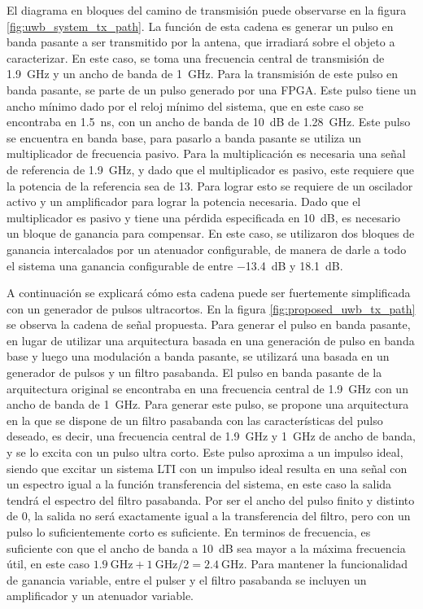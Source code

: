 El diagrama en bloques del camino de transmisión puede observarse en la figura
\ref{fig:uwb_system_tx_path}. La función de esta cadena es generar un pulso en
banda pasante a ser transmitido por la antena, que irradiará sobre el objeto a
caracterizar. En este caso, se toma una frecuencia central de transmisión de
\qty{1.9}{\giga\hertz} y un ancho de banda de \qty{1}{\giga\hertz}. Para la
transmisión de este pulso en banda pasante, se parte de un pulso generado por
una FPGA. Este pulso tiene un ancho mínimo dado por el reloj mínimo del sistema,
que en este caso se encontraba en \qty{1.5}{\nano\second}, con un ancho de banda
de \qty{10}{\dB} de \qty{1.28}{\giga\hertz}. Este pulso se encuentra en banda
base, para pasarlo a banda pasante se utiliza un multiplicador de frecuencia
pasivo. Para la multiplicación es necesaria una señal de referencia de
\qty{1.9}{\giga\hertz}, y dado que el multiplicador es pasivo, este requiere que
la potencia de la referencia sea de \qty{13}{\dBm}.  Para lograr esto se
requiere de un oscilador activo y un amplificador para lograr la potencia
necesaria. Dado que el multiplicador es pasivo y tiene una pérdida especificada
en \qty{10}{\dB}, es necesario un bloque de ganancia para compensar. En este
caso, se utilizaron dos bloques de ganancia intercalados por un atenuador
configurable, de manera de darle a todo el sistema una ganancia configurable de
entre \qty{-13.4}{\dB} y \qty{18.1}{\dB}.

A continuación se explicará cómo esta cadena puede ser fuertemente simplificada
con un generador de pulsos ultracortos. En la figura
\ref{fig:proposed_uwb_tx_path} se observa la cadena de señal propuesta. Para
generar el pulso en banda pasante, en lugar de utilizar una arquitectura basada
en una generación de pulso en banda base y luego una modulación a banda pasante,
se utilizará una basada en un generador de pulsos y un filtro pasabanda. El
pulso en banda pasante de la arquitectura original se encontraba en una
frecuencia central de \qty{1.9}{\giga\hertz} con un ancho de banda de
\qty{1}{\giga\hertz}. Para generar este pulso, se propone una arquitectura en la
que se dispone de un filtro pasabanda con las características del pulso deseado,
es decir, una frecuencia central de \qty{1,9}{\giga\hertz} y
\qty{1}{\giga\hertz} de ancho de banda, y se lo excita con un pulso ultra corto.
Este pulso aproxima a un impulso ideal, siendo que excitar un sistema LTI con un
impulso ideal resulta en una señal con un espectro igual a la función
transferencia del sistema, en este caso la salida tendrá el espectro del filtro
pasabanda. Por ser el ancho del pulso finito y distinto de 0, la salida no será
exactamente igual a la transferencia del filtro, pero con un pulso lo
suficientemente corto es suficiente. En terminos de frecuencia, es suficiente
con que el ancho de banda a \qty{10}{\dB} sea mayor a la máxima frecuencia útil,
en este caso $ \qty{1,9}{\giga\hertz}+ \qty{1}{\giga\hertz}/2 =
\qty{2,4}{\giga\hertz}$. Para mantener la funcionalidad de ganancia variable,
entre el pulser y el filtro pasabanda se incluyen un amplificador y un atenuador
variable.

